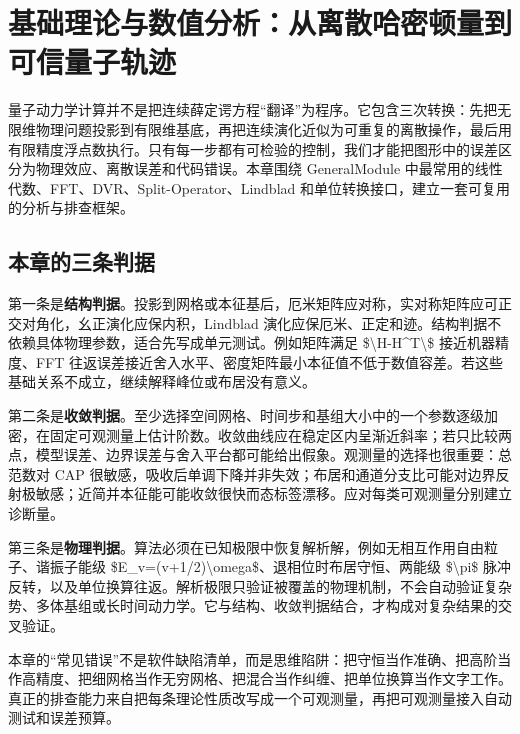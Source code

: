 \documentclass[UTF8,openany,11pt,fontset=fandol]{ctexbook}
\begin{document}
\chapter{基础理论与数值分析：从离散哈密顿量到可信量子轨迹}\label{ux57faux7840ux7406ux8bbaux4e0eux6570ux503cux5206ux6790ux4eceux79bbux6563ux54c8ux5bc6ux987fux91cfux5230ux53efux4fe1ux91cfux5b50ux8f68ux8ff9}

量子动力学计算并不是把连续薛定谔方程``翻译''为程序。它包含三次转换：先把无限维物理问题投影到有限维基底，再把连续演化近似为可重复的离散操作，最后用有限精度浮点数执行。只有每一步都有可检验的控制，我们才能把图形中的误差区分为物理效应、离散误差和代码错误。本章围绕
GeneralModule 中最常用的线性代数、FFT、DVR、Split-Operator、Lindblad
和单位转换接口，建立一套可复用的分析与排查框架。

\section{\texorpdfstring{\textbf{本章的三条判据}}{本章的三条判据}}\label{ux672cux7ae0ux7684ux4e09ux6761ux5224ux636e}

第一条是\textbf{结构判据}。投影到网格或本征基后，厄米矩阵应对称，实对称矩阵应可正交对角化，幺正演化应保内积，Lindblad
演化应保厄米、正定和迹。结构判据不依赖具体物理参数，适合先写成单元测试。例如矩阵满足
\$\textbackslash\textbar H-H\^{}T\textbackslash\textbar\$
接近机器精度、FFT
往返误差接近舍入水平、密度矩阵最小本征值不低于数值容差。若这些基础关系不成立，继续解释峰位或布居没有意义。

第二条是\textbf{收敛判据}。至少选择空间网格、时间步和基组大小中的一个参数逐级加密，在固定可观测量上估计阶数。收敛曲线应在稳定区内呈渐近斜率；若只比较两点，模型误差、边界误差与舍入平台都可能给出假象。观测量的选择也很重要：总范数对
CAP
很敏感，吸收后单调下降并非失效；布居和通道分支比可能对边界反射极敏感；近简并本征能可能收敛很快而态标签漂移。应对每类可观测量分别建立诊断量。

第三条是\textbf{物理判据}。算法必须在已知极限中恢复解析解，例如无相互作用自由粒子、谐振子能级
\$E\_v=(v+1/2)\textbackslash omega\$、退相位时布居守恒、两能级
\$\textbackslash pi\$
脉冲反转，以及单位换算往返。解析极限只验证被覆盖的物理机制，不会自动验证复杂势、多体基组或长时间动力学。它与结构、收敛判据结合，才构成对复杂结果的交叉验证。

本章的``常见错误''不是软件缺陷清单，而是思维陷阱：把守恒当作准确、把高阶当作高精度、把细网格当作无穷网格、把混合当作纠缠、把单位换算当作文字工作。真正的排查能力来自把每条理论性质改写成一个可观测量，再把可观测量接入自动测试和误差预算。
\end{document}
